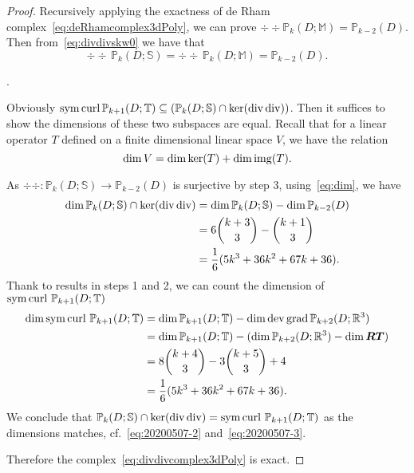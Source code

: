 \begin{proof}
\medskip
{} 
Recursively applying the exactness of de Rham complex~\eqref{eq:deRhamcomplex3dPoly}, we can prove $\div\div\mathbb P_k(D; \mathbb M)=\mathbb P_{k-2}(D)$. 
Then from~\eqref{eq:divdivskw0} we have that
\[
\div{\div}\, \mathbb P_k(D; \mathbb S)=\div{\div}\, \mathbb P_k(D; \mathbb M)=\mathbb P_{k-2}(D).
\]

\medskip
{}. 

Obviously $\operatorname{sym}\operatorname{curl}\mathbb P_{k+1}(D;\mathbb T) \subseteq (\mathbb P_k(D; \mathbb S) \cap\ker(\operatorname{div}\operatorname{div}))$.
Then it suffices to show the dimensions of these two subspaces are equal. Recall that for a linear operator $T$ defined on a finite dimensional linear space $V$, we have the relation
\begin{equation}\label{eq:dim}
\dim V = \dim \ker(T) + \dim \operatorname*{img}(T). 
\end{equation}

As $\div\div: \mathbb P_k(D; \mathbb S)\to\mathbb P_{k-2}(D)$ is surjective by step 3, using~\eqref{eq:dim}, we have
\begin{align}
\dim\mathbb P_k(D; \mathbb S)\cap\ker(\div{\div})&=\dim\mathbb P_k(D; \mathbb S)-\dim\mathbb P_{k-2}(D) \notag\\
& = 6 { k + 3 \choose 3} - { k + 1 \choose 3} \notag\\
&= \frac{1}{6}(5k^3+36k^2+67k+36). \label{eq:20200507-2} %
\end{align}
Thank to results in steps 1 and 2, we can count the dimension of $\operatorname{sym}\operatorname{curl} \, \mathbb P_{k+1}(D; \mathbb T)$
\begin{align}
\dim\operatorname{sym}\operatorname{curl} \, \mathbb P_{k+1}(D; \mathbb T) &= \dim\mathbb P_{k+1}(D; \mathbb T)-\dim\operatorname{dev}\operatorname{grad}\mathbb P_{k+2}(D; \mathbb R^3) \notag\\
& = \dim\mathbb P_{k+1}(D; \mathbb T)-(\dim \mathbb P_{k+2}(D; \mathbb R^3) - \dim \boldsymbol{RT}) \notag\\
& = 8 { k + 4 \choose 3} - 3{ k + 5 \choose 3} + 4 \notag\\
&= \frac{1}{6}(5k^3+36k^2+67k+36). \label{eq:20200507-3}
\end{align}
We conclude that $\mathbb P_k(D; \mathbb S)\cap\ker(\operatorname{div}{\operatorname{div}})=\operatorname{sym}\operatorname{curl} \, \mathbb P_{k+1}(D; \mathbb T)$ as the dimensions matches, cf.~\eqref{eq:20200507-2} and~\eqref{eq:20200507-3}.

Therefore the complex~\eqref{eq:divdivcomplex3dPoly} is exact.
\end{proof}
%

